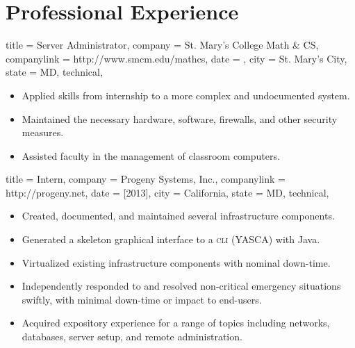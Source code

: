 \documentclass[
textout=\jobname.cv.txt,
textout preamble = preamble.txt,
]{bettercv}
\begin{document}
\section{Professional Experience}

\begin{position}
  {
    title   = Server Administrator,
    company = St. Mary's College \Dash Math \& CS,
    companylink = http://www.smcm.edu/mathcs,
    date    = ,
    city    = St. Mary's City,
    state   = MD,
    technical,
  }

\begin{itemize}
\item Applied skills from internship to a more complex and undocumented system.
\item Maintained the necessary hardware, software, firewalls, and other security measures.
\item Assisted faculty in the management of classroom computers.
\end{itemize}
\end{position}

\begin{position}
  {
    title   = Intern,
    company = {Progeny Systems, Inc.},
    companylink = http://progeny.net,
    date    = [2013],
    city    = California,
    state   = MD,
    technical,
  }

\begin{itemize}
\item Created, documented, and maintained several infrastructure components.
\item Generated a skeleton graphical interface to a \textsc{cli} (YASCA) with Java.
\item Virtualized existing infrastructure components with nominal down-time.
\item Independently responded to and resolved non-critical emergency situations swiftly, with minimal down-time or impact to end-users.
\item Acquired expository experience for a range of topics including
  networks,
  databases,
  server setup, and
  remote administration.
\end{itemize}
\end{position}
\end{document}
